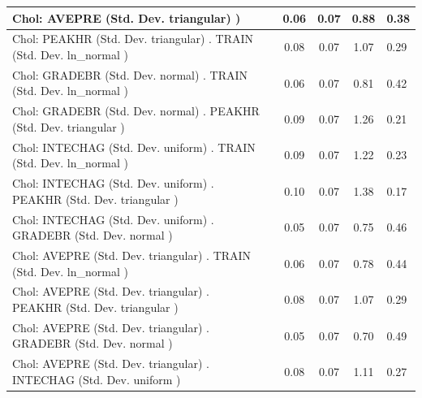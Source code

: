 \begin{table}
\begin{center}
\begin{tabular}{|l|l|c|c|c|l|}
			\hline
			 Chol: AVEPRE (Std. Dev. triangular) ) &  & 0.06 & 0.07 & 0.88 & 0.38 \\
			\hline
			 Chol: PEAKHR (Std. Dev. triangular) . TRAIN (Std. Dev.   ln_normal ) &  & 0.08 & 0.07 & 1.07 & 0.29 \\
			\hline
			 Chol: GRADEBR (Std. Dev. normal) . TRAIN (Std. Dev.   ln_normal ) &  & 0.06 & 0.07 & 0.81 & 0.42 \\
			\hline
			 Chol: GRADEBR (Std. Dev. normal) . PEAKHR (Std. Dev.   triangular ) &  & 0.09 & 0.07 & 1.26 & 0.21 \\
			\hline
			 Chol: INTECHAG (Std. Dev. uniform) . TRAIN (Std. Dev.   ln_normal ) &  & 0.09 & 0.07 & 1.22 & 0.23 \\
			\hline
			 Chol: INTECHAG (Std. Dev. uniform) . PEAKHR (Std. Dev.   triangular ) &  & 0.10 & 0.07 & 1.38 & 0.17 \\
			\hline
			 Chol: INTECHAG (Std. Dev. uniform) . GRADEBR (Std. Dev.   normal ) &  & 0.05 & 0.07 & 0.75 & 0.46 \\
			\hline
			 Chol: AVEPRE (Std. Dev. triangular) . TRAIN (Std. Dev.   ln_normal ) &  & 0.06 & 0.07 & 0.78 & 0.44 \\
			\hline
			 Chol: AVEPRE (Std. Dev. triangular) . PEAKHR (Std. Dev.   triangular ) &  & 0.08 & 0.07 & 1.07 & 0.29 \\
			\hline
			 Chol: AVEPRE (Std. Dev. triangular) . GRADEBR (Std. Dev.   normal ) &  & 0.05 & 0.07 & 0.70 & 0.49 \\
			\hline
			 Chol: AVEPRE (Std. Dev. triangular) . INTECHAG (Std. Dev.   uniform ) &  & 0.08 & 0.07 & 1.11 & 0.27 \\
			\hline
		\end{tabular}
	\end{center}
\end{table}